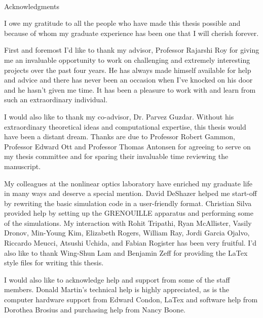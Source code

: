 
\renewcommand{\baselinestretch}{2}
\small\normalsize
\hbox{\ }

\vspace{-.65in}

\begin{center}
\large{Acknowledgments}
\end{center}

\vspace{1ex}

I owe my gratitude to all the people who have made this thesis possible and because of whom my graduate experience has been one that I will cherish forever.

First and foremost I'd like to thank my advisor, Professor Rajarshi Roy for giving me an invaluable opportunity to work on challenging and extremely interesting projects over the past four years. He has always made himself available for help and advice and there has never been an occasion when I've knocked on his door and he hasn't given me time. It has been a pleasure to work with and learn from such an extraordinary individual.

I would also like to thank my co-advisor, Dr. Parvez Guzdar. Without his extraordinary theoretical ideas and computational expertise, this thesis would have been a distant dream. Thanks are due to Professor Robert Gammon, Professor Edward Ott and Professor Thomas Antonsen for agreeing to serve on my thesis committee and for sparing their invaluable time reviewing the manuscript.

My colleagues at the nonlinear optics laboratory have enriched my graduate life in many ways and deserve a special mention. David DeShazer helped me start-off by rewriting the basic simulation code in a user-friendly format. Christian Silva provided help by setting up the GRENOUILLE apparatus and performing some of the simulations. My interaction with  Rohit Tripathi, Ryan McAllister, Vasily Dronov, Min-Young Kim, Elizabeth Rogers, William Ray, Jordi Garcia Ojalvo, Riccardo Meucci, Atsushi Uchida, and Fabian Rogister has been very fruitful. I'd also like to thank Wing-Shun Lam and Benjamin Zeff for providing the LaTex style files for writing this thesis.

I would also like to acknowledge help and support from some of the staff members. Donald Martin's technical help is highly appreciated, as is the computer hardware support from Edward Condon, LaTex and software help from Dorothea Brosius and purchasing help from Nancy Boone.

